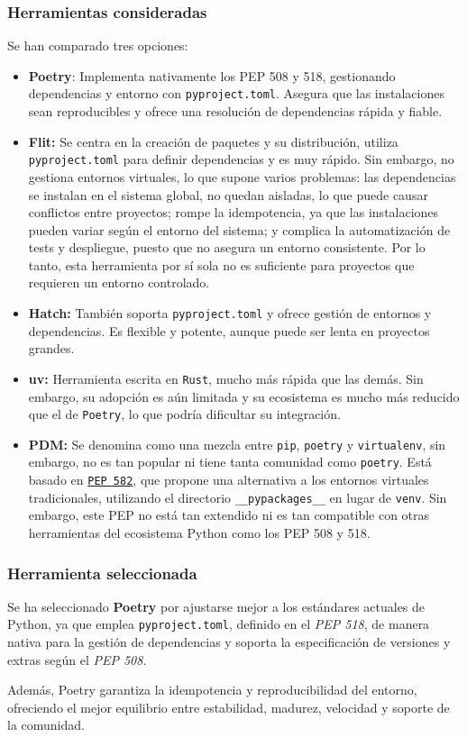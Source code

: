 \subsubsection{Herramientas consideradas}
Se han comparado tres opciones:
\begin{itemize}
    \item \textbf{Poetry}: Implementa nativamente los PEP 508 y 518, gestionando dependencias
    y entorno con \texttt{pyproject.toml}. Asegura que las instalaciones sean reproducibles y
    ofrece una resolución de dependencias rápida y fiable.
    \item \textbf{Flit:} Se centra en la creación de paquetes y su distribución, utiliza
    \texttt{pyproject.toml} para definir dependencias y es muy rápido. Sin embargo, no gestiona
    entornos virtuales, lo que supone varios problemas: las dependencias se instalan  en el sistema
    global, no quedan aisladas, lo que puede causar conflictos entre proyectos; rompe la idempotencia,
    ya que las instalaciones pueden variar según el entorno del sistema; y complica la automatización
    de tests y despliegue, puesto que no asegura un entorno consistente. Por lo tanto, esta herramienta por
    sí sola no es suficiente para proyectos que requieren un entorno controlado.
    \item \textbf{Hatch:} También soporta \texttt{pyproject.toml} y ofrece gestión de entornos
    y dependencias. Es flexible y potente, aunque puede ser lenta en proyectos grandes. 
    \item \textbf{uv: } Herramienta escrita en \texttt{Rust}, mucho más rápida que las demás.
    Sin embargo, su adopción es aún limitada y su ecosistema es mucho más reducido que el de
    \texttt{Poetry}, lo que podría dificultar su integración.
    \item \textbf{PDM: } Se denomina como una mezcla entre \texttt{pip}, \texttt{poetry} y 
    \texttt{virtualenv}, sin embargo, no es tan popular ni tiene tanta comunidad como \texttt{poetry}.
    Está basado en \texttt{\href{https://peps.python.org/pep-0582/}{PEP 582}}, que propone una alternativa a los entornos virtuales tradicionales,
    utilizando el directorio \texttt{\_\_pypackages\_\_} en lugar de \texttt{venv}. Sin embargo,
    este PEP no está tan extendido ni es tan compatible con otras herramientas del ecosistema
    Python como los PEP 508 y 518.
\end{itemize}

\subsubsection{Herramienta seleccionada}
Se ha seleccionado \textbf{Poetry} por ajustarse mejor a los estándares actuales de Python, ya
que emplea \texttt{pyproject.toml}, definido en el \textit{PEP 518}, de manera nativa para la
gestión de dependencias y soporta la especificación de versiones y extras según el \textit{PEP 508}.

Además, Poetry garantiza la idempotencia y reproducibilidad del entorno, ofreciendo el mejor equilibrio
entre estabilidad, madurez, velocidad y soporte de la comunidad.